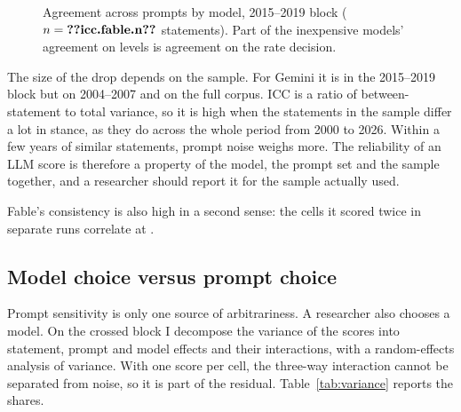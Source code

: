 \begin{table}[t]
\centering
\caption{Agreement across five prompts}\label{tab:reliability}
\footnotesize
\setlength{\tabcolsep}{4pt}

\end{table}

\begin{figure}[t]
\centering

\caption{Agreement across prompts by model, 2015--2019 block ($n=\R{icc.fable.n}$ statements). Part of
the inexpensive models' agreement on levels is agreement on the rate decision.}\label{fig:icc}
\end{figure}

The size of the drop depends on the sample. For Gemini it is  in the 2015--2019 block but
 on 2004--2007 and  on the full corpus. ICC is a ratio of
between-statement to total variance, so it is high when the statements in the sample differ a lot in
stance, as they do across the whole period from 2000 to 2026. Within a few years of similar statements,
prompt noise weighs more. The reliability of an LLM score is therefore a property of the model, the
prompt set and the sample together, and a researcher should report it for the sample actually used.

Fable's consistency is also high in a second sense: the  cells it scored twice in separate
runs correlate at .

\subsection{Model choice versus prompt choice}

Prompt sensitivity is only one source of arbitrariness. A researcher also chooses a model. On the crossed
block I decompose the variance of the scores into statement, prompt and model effects and their
interactions, with a random-effects analysis of variance. With one score per cell, the three-way
interaction cannot be separated from noise, so it is part of the residual. Table~\ref{tab:variance}
reports the shares.

